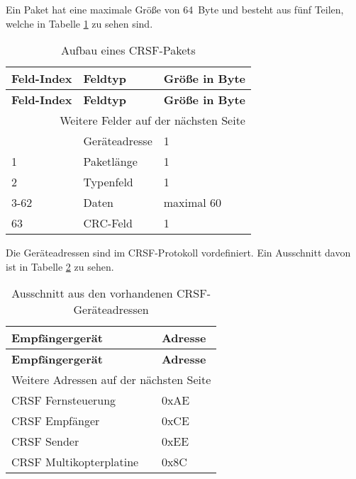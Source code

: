 Ein Paket hat eine maximale Größe von 64~Byte und besteht aus fünf Teilen, welche in Tabelle \ref{table:crsfPaket} zu sehen sind. \cite{cleanflightCrsf}

\begin{longtable}[c]{|l|l|l|}
    \caption{Aufbau eines CRSF-Pakets \cite{cleanflightCrsf}}
    \label{table:crsfPaket}\\
    \hline
    \textbf{Feld-Index} & \textbf{Feldtyp} & \textbf{Größe in Byte}\\
    \hline
    \hline
    \endfirsthead

    \hline
    \textbf{Feld-Index} & \textbf{Feldtyp} & \textbf{Größe in Byte}\\
    \hline
    \hline
    \endhead

    \hline
    \multicolumn{3}{|r|}{Weitere Felder auf der nächsten Seite}\\
    \hline
    \endfoot

    \hline
    \endlastfoot
    0 & Geräteadresse & 1\\
    \hline
    1 & Paketlänge & 1\\
    \hline
    2 & Typenfeld & 1\\
    \hline
    3-62 & Daten & maximal 60\\
    \hline
    63 & \ac{CRC}-Feld & 1\\
\end{longtable}

Die Geräteadressen sind im CRSF-Protokoll vordefiniert. Ein Ausschnitt davon ist in Tabelle \ref{table:crsfAdressen} zu sehen.

\begin{longtable}[c]{|l|l|}
    \caption{Ausschnitt aus den vorhandenen CRSF-Geräteadressen \cite{cleanflightCrsfP}}
    \label{table:crsfAdressen}\\
    \hline
    \textbf{Empfängergerät} & \textbf{Adresse}\\
    \hline
    \hline
    \endfirsthead

    \hline
    \textbf{Empfängergerät} & \textbf{Adresse}\\
    \hline
    \hline
    \endhead

    \hline
    \multicolumn{2}{|r|}{Weitere Adressen auf der nächsten Seite}\\
    \hline
    \endfoot

    \hline
    \endlastfoot
    
    CRSF Fernsteuerung & 0xAE \\
    \hline
    CRSF Empfänger & 0xCE \\
    \hline
    CRSF Sender & 0xEE \\
    \hline
    CRSF Multikopterplatine & 0x8C \\
\end{longtable}

